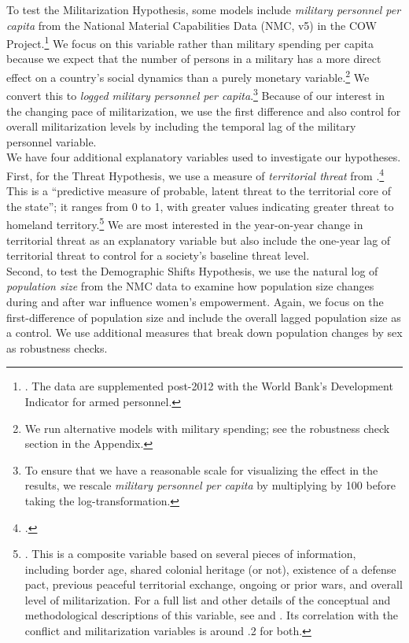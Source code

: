 \documentclass [12pt] {article}
\begin{document}
To test the Militarization Hypothesis, some models include {\it military personnel per capita} from the National Material Capabilities Data (NMC, v5) in the COW Project.\footnote{. The data are supplemented post-2012 with the World Bank's Development Indicator for armed personnel.} We focus on this variable rather than military spending per capita because we expect that the number of persons in a military has a more direct effect on a country's social dynamics than a purely monetary variable.\footnote{We run alternative models with military spending; see the robustness check section in the Appendix.} We convert this to {\it logged military personnel per capita}.\footnote{To ensure that we have a reasonable scale for visualizing the effect in the results, we rescale {\it military personnel per capita} by multiplying by 100 before taking the log-transformation.} Because of our interest in the changing pace of militarization, we use the first difference and also control for overall militarization levels by including the temporal lag of the military personnel variable. \\

We have four additional explanatory variables used to investigate our hypotheses. First, for the Threat Hypothesis, we use a measure of {\it territorial threat} from \citeauthor{gibler2013territorial}.\footnote{.} This is a ``predictive measure of probable, latent threat to the territorial core of the state''; it ranges from 0 to 1, with greater values indicating greater threat to homeland territory.\footnote{. This is a composite variable based on several pieces of information, including border age, shared colonial heritage (or not), existence of a defense pact, previous peaceful territorial exchange, ongoing or prior wars, and overall level of militarization. For a full list and other details of the conceptual and methodological descriptions of this variable, see  and . Its correlation with the conflict and militarization variables is around .2 for both.} We are most interested in the year-on-year change in territorial threat as an explanatory variable but also include the one-year lag of territorial threat to control for a society's baseline threat level.\\

Second, to test the Demographic Shifts Hypothesis, we use the natural log of {\it population size} from the NMC data to examine how population size changes during and after war influence women's empowerment. Again, we focus on the first-difference of population size and include the overall lagged population size as a control. We use additional measures that break down population changes by sex as robustness checks.  \\
\end{document}
